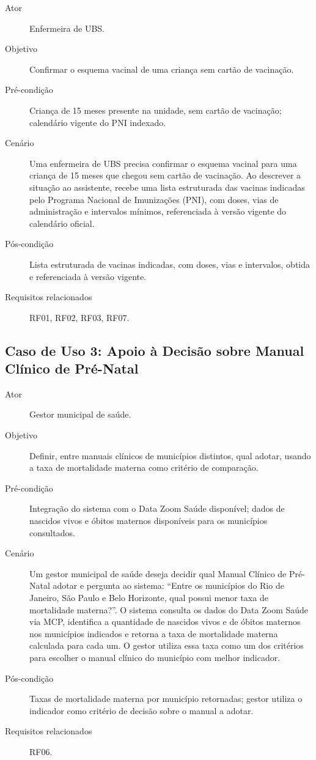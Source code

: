 \documentclass[conference,a4paper]{IEEEtran}
\begin{document}
\begin{description}
  \item[Ator] Enfermeira de UBS.
  \item[Objetivo] Confirmar o esquema vacinal de uma criança sem cartão de vacinação.
  \item[Pré-condição] Criança de 15 meses presente na unidade, sem cartão de vacinação; calendário vigente do PNI indexado.
  \item[Cenário] Uma enfermeira de UBS precisa confirmar o esquema vacinal para uma criança de 15 meses que chegou sem cartão de vacinação. Ao descrever a situação ao assistente, recebe uma lista estruturada das vacinas indicadas pelo Programa Nacional de Imunizações (PNI), com doses, vias de administração e intervalos mínimos, referenciada à versão vigente do calendário oficial.
  \item[Pós-condição] Lista estruturada de vacinas indicadas, com doses, vias e intervalos, obtida e referenciada à versão vigente.
  \item[Requisitos relacionados] RF01, RF02, RF03, RF07.
\end{description}

\subsection{Caso de Uso 3: Apoio à Decisão sobre Manual Clínico de Pré-Natal}

\begin{description}
  \item[Ator] Gestor municipal de saúde.
  \item[Objetivo] Definir, entre manuais clínicos de municípios distintos, qual adotar, usando a taxa de mortalidade materna como critério de comparação.
  \item[Pré-condição] Integração do sistema com o Data Zoom Saúde disponível; dados de nascidos vivos e óbitos maternos disponíveis para os municípios consultados.
  \item[Cenário] Um gestor municipal de saúde deseja decidir qual Manual Clínico de Pré-Natal adotar e pergunta ao sistema: ``Entre os municípios do Rio de Janeiro, São Paulo e Belo Horizonte, qual possui menor taxa de mortalidade materna?''. O sistema consulta os dados do Data Zoom Saúde via MCP, identifica a quantidade de nascidos vivos e de óbitos maternos nos municípios indicados e retorna a taxa de mortalidade materna calculada para cada um. O gestor utiliza essa taxa como um dos critérios para escolher o manual clínico do município com melhor indicador.
  \item[Pós-condição] Taxas de mortalidade materna por município retornadas; gestor utiliza o indicador como critério de decisão sobre o manual a adotar.
  \item[Requisitos relacionados] RF06.
\end{description}
\end{document}
